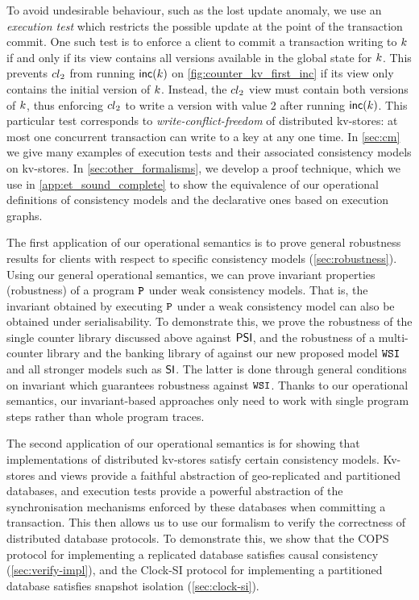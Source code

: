 To avoid undesirable behaviour, such as the lost update anomaly, we
use an {\em execution test} which restricts the possible update at the
point of the transaction commit.  One such test is to enforce a client
to commit a transaction writing to \(k\) if and only if its view
contains all versions available in the global state for \(k\).  This
prevents \({cl}_2\) from running \(\mathsf{inc}(k)\) on
\cref{fig:counter_kv_first_inc} if its view only contains the initial
version of \(k\).  Instead, the \({cl}_2\) view must contain both
versions of \(k\), thus enforcing \({cl}_2\) to write a version with
value \(2\) after running \(\mathsf{inc}(k)\). This particular test
corresponds to \emph{write-conflict-freedom} of distributed kv-stores:
at most one concurrent transaction can write to a key at any one time.
In \cref{sec:cm} we give many examples of execution tests and their
associated consistency models on kv-stores. In \cref{sec:other_formalisms}, we
develop a proof technique, which we use in \cref{app:et_sound_complete} 
to show the equivalence of our operational definitions of consistency models and the 
declarative ones based on  
execution graphs. 

The first application of our operational semantics is to prove
general robustness results for clients with respect to specific
consistency models (\cref{sec:robustness}). 
Using our general operational semantics, we can prove invariant properties (\eg robustness)
of a program \(\mathtt{P}\) under weak consistency models. 
That is, the invariant obtained by executing \(\mathtt{P}\) under a weak consistency model can also be obtained under serialisability.
To demonstrate this, we prove the robustness of the single
counter library discussed above against \(\mathsf{PSI}\), and the robustness of a multi-counter library and the banking library of \citet{bank-example-wsi}
against our new proposed model \(\mathtt{WSI}\) and all stronger models such as \(\mathsf{SI}\).
The latter is done through general conditions on invariant which guarantees robustness against \( \mathtt{WSI} \).
Thanks to our operational semantics, our invariant-based approaches only need to work with single program steps rather than whole program traces.

The second application of our operational
semantics is for showing that implementations of distributed
kv-stores satisfy certain consistency models. 
Kv-stores and views provide a 
faithful abstraction of geo-replicated and partitioned
databases, and  execution tests provide a powerful abstraction of the synchronisation mechanisms 
enforced by these databases when committing a transaction. 
This then allows us to use our 
formalism to verify the correctness of distributed database protocols. 
To demonstrate this, we show that the
COPS protocol \citep{cops} for implementing a replicated database satisfies causal consistency  (\cref{sec:verify-impl}), 
and the Clock-SI protocol \citep{clocksi} for implementing a
partitioned database satisfies snapshot isolation (\cref{sec:clock-si}). 


